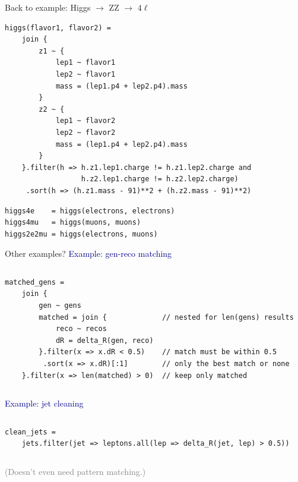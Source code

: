\documentclass[aspectratio=169]{beamer}
\begin{document}
\begin{frame}[fragile]{Back to example: Higgs $\to$ ZZ $\to$ $4\ell$}
\small
\begin{verbatim}
higgs(flavor1, flavor2) =
    join {
        z1 ~ {
            lep1 ~ flavor1
            lep2 ~ flavor1
            mass = (lep1.p4 + lep2.p4).mass
        }
        z2 ~ {
            lep1 ~ flavor2
            lep2 ~ flavor2
            mass = (lep1.p4 + lep2.p4).mass
        }
    }.filter(h => h.z1.lep1.charge != h.z1.lep2.charge and
                  h.z2.lep1.charge != h.z2.lep2.charge)
     .sort(h => (h.z1.mass - 91)**2 + (h.z2.mass - 91)**2)
\end{verbatim}
\begin{verbatim}
higgs4e    = higgs(electrons, electrons)
higgs4mu   = higgs(muons, muons)
higgs2e2mu = higgs(electrons, muons)
\end{verbatim}
\end{frame}

\begin{frame}[fragile]{Other examples?}
\small
\vspace{0.5 cm}
\textcolor{darkblue}{\large Example: gen-reco matching}

\vspace{-0.25 cm}
\begin{columns}
\begin{verbatim}
matched_gens =
    join {
        gen ~ gens
        matched = join {             // nested for len(gens) results
            reco ~ recos
            dR = delta_R(gen, reco)
        }.filter(x => x.dR < 0.5)    // match must be within 0.5
         .sort(x => x.dR)[:1]        // only the best match or none
    }.filter(x => len(matched) > 0)  // keep only matched
\end{verbatim}
\end{columns}

\vspace{0.5 cm}
\textcolor{darkblue}{\large Example: jet cleaning}

\vspace{-0.25 cm}
\begin{columns}
\begin{verbatim}
clean_jets =
    jets.filter(jet => leptons.all(lep => delta_R(jet, lep) > 0.5))
\end{verbatim}
\end{columns}

\vspace{0.25 cm}
\textcolor{gray}{\normalsize (Doesn't even need pattern matching.)}
\end{frame}
\end{document}
